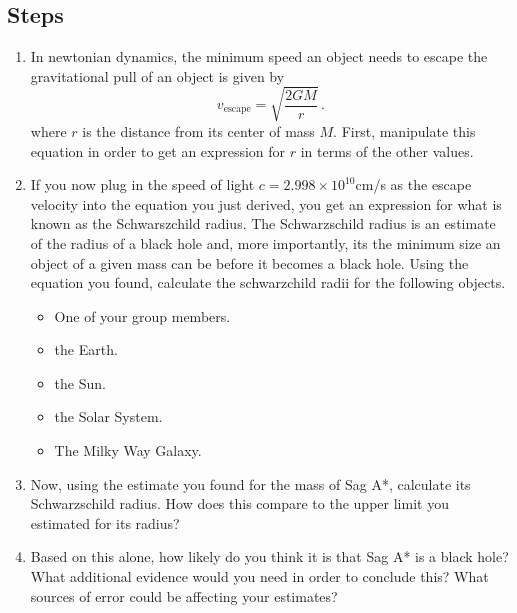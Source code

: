 \subsection{Steps}
\begin{enumerate}
	\item In newtonian dynamics, the minimum speed an object needs to escape the gravitational pull of an object is given by 
	\begin{equation}\label{gc:eq:escape-speed}
		v_\textrm{escape} = \sqrt{\frac{2 G M}{r}} \,.
	\end{equation}
	where $r$ is the distance from its center of mass $M$. First, manipulate this equation in order to get an expression for $r$ in terms of the other values.
	
	\item If you now plug in the speed of light $c = 2.998 \times 10^{10}$cm/s as the escape velocity into the equation you just derived, you get an expression for what is known as the Schwarszchild radius. The Schwarzschild radius is an estimate of the radius of a black hole and, more importantly, its the minimum size an object of a given mass can be before it becomes a black hole. Using the equation you found, calculate the schwarzchild radii for the following objects.
	\begin{itemize}
		\item One of your group members.
		\item the Earth.
		\item the Sun.
		\item the Solar System.
		\item The Milky Way Galaxy.
	\end{itemize}
	
	\item Now, using the estimate you found for the mass of Sag A*, calculate its Schwarzschild radius. How does this compare to the upper limit you estimated for its radius? 
	
	\item Based on this alone, how likely do you think it is that Sag A* is a black hole? What additional evidence would you need in order to conclude this? What sources of error could be affecting your estimates? 
\end{enumerate}


